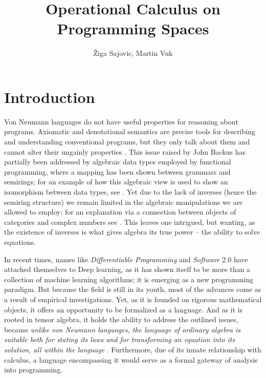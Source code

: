
\title{Operational Calculus on Programming Spaces}
\author{\v{Z}iga Sajovic, Martin Vuk}



\maketitle

\section{Introduction}

Von Neumann languages do not have useful properties for reasoning about programs. Axiomatic and denotational semantics are precise tools for describing and understanding conventional programs, but they only talk about them and cannot alter their ungainly
properties \cite{backus}. This issue raised by John Backus has partially been addressed by algebraic data types employed by functional programming, where a mapping has been shown between grammars and semirings; for an example of how this algebraic view is used to show an isomorphism between data types, see \cite{7Trees}. Yet due to the lack of inverses (hence the semiring structure) we remain limited in the algebraic manipulations we are allowed to employ; for an explanation via a connection between objects of categories and complex numbers see \cite{complexCat}. This leaves one intrigued, but wanting, as the existence of inverses is what gives algebra its true power -- the ability to solve equations.

In recent times, names like \emph{Differentiable Programming} and \emph{Software $2.0$} have attached themselves to Deep learning, as it has shown itself to be more than a collection of machine learning algorithms; it is emerging as a new programming paradigm.
But because the field is still in its youth, most of the advances come as a result of empirical investigations.
Yet, as it is founded on rigorous mathematical objects, it offers an opportunity to be formalized as a language.
And as it is rooted in tensor algebra, it holds the ability to address the outlined issues, because \emph{unlike von Neumann languages, the language of ordinary algebra is suitable both for stating its laws and for transforming
an equation into its solution, all within the language} \cite{backus}.
Furthermore, due of its innate relationship with calculus, a language encompassing it would serve as a formal gateway of analysis into programming.

